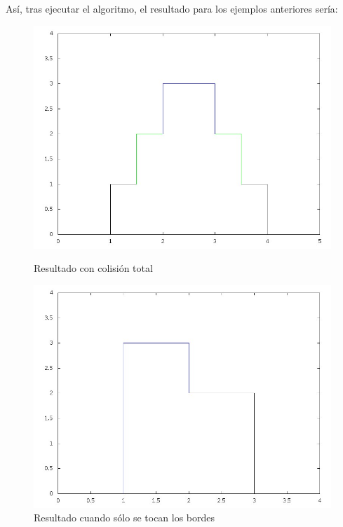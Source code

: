 \noindent Así, tras ejecutar el algoritmo, el resultado para los ejemplos anteriores sería:

\begin{figure}[ht]
	\begin{minipage}[t]{0.5\linewidth}
		\centering
		\includegraphics[width=\textwidth]{p1_ej1_post.jpg}
		\caption{Resultado con colisión total}
		\label{fig:p1_ej1_post}
	\end{minipage}
	\begin{minipage}[t]{0.5\linewidth}
		\centering
		\includegraphics[width=\textwidth]{p1_ej2_post.jpg}
		\caption{Resultado cuando sólo se tocan los bordes}
		\label{fig:p1_ej2_post}
	\end{minipage}
\end{figure}

